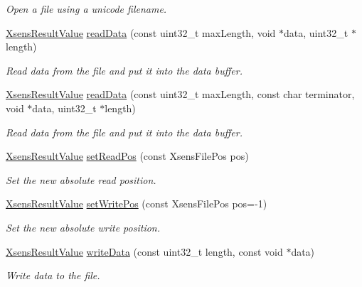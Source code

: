 \begin{DoxyCompactItemize}
\begin{DoxyCompactList}\small\item\em \-Open a file using a unicode filename. \end{DoxyCompactList}\item 
\hyperlink{group__enums_ga822a2260a20af524029eef9e9a51ff6f}{\-Xsens\-Result\-Value} \hyperlink{classxsens_1_1Cmt1f_ad5850430ffa0988986c0b10d218023a2}{read\-Data} (const uint32\-\_\-t max\-Length, void $\ast$data, uint32\-\_\-t $\ast$length)
\begin{DoxyCompactList}\small\item\em \-Read data from the file and put it into the data buffer. \end{DoxyCompactList}\item 
\hyperlink{group__enums_ga822a2260a20af524029eef9e9a51ff6f}{\-Xsens\-Result\-Value} \hyperlink{classxsens_1_1Cmt1f_ad264a2ef6cdc9a6cfe0b9fce04e466f0}{read\-Data} (const uint32\-\_\-t max\-Length, const char terminator, void $\ast$data, uint32\-\_\-t $\ast$length)
\begin{DoxyCompactList}\small\item\em \-Read data from the file and put it into the data buffer. \end{DoxyCompactList}\item 
\hyperlink{group__enums_ga822a2260a20af524029eef9e9a51ff6f}{\-Xsens\-Result\-Value} \hyperlink{classxsens_1_1Cmt1f_ae901294366012d032ebe13660a1564cc}{set\-Read\-Pos} (const \-Xsens\-File\-Pos pos)
\begin{DoxyCompactList}\small\item\em \-Set the new absolute read position. \end{DoxyCompactList}\item 
\hyperlink{group__enums_ga822a2260a20af524029eef9e9a51ff6f}{\-Xsens\-Result\-Value} \hyperlink{classxsens_1_1Cmt1f_a783c34b3976303be5e776c6b0d815768}{set\-Write\-Pos} (const \-Xsens\-File\-Pos pos=-\/1)
\begin{DoxyCompactList}\small\item\em \-Set the new absolute write position. \end{DoxyCompactList}\item 
\hyperlink{group__enums_ga822a2260a20af524029eef9e9a51ff6f}{\-Xsens\-Result\-Value} \hyperlink{classxsens_1_1Cmt1f_aa62d96ccce3c8e407d20bd0346d94991}{write\-Data} (const uint32\-\_\-t length, const void $\ast$data)
\begin{DoxyCompactList}\small\item\em \-Write data to the file. \end{DoxyCompactList}\end{DoxyCompactItemize}

